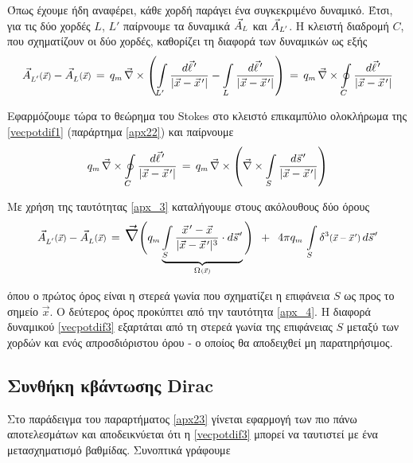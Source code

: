 Όπως έχουμε ήδη αναφέρει, κάθε χορδή παράγει ένα συγκεκριμένο δυναμικό. Έτσι, για τις δύο χορδές $L$, $L'$ παίρνουμε τα δυναμικά $\vec{A}\subscr{L}$ και $\vec{A}\subscr{L'}$. Η κλειστή διαδρομή $C$, που σχηματίζουν οι δύο χορδές, καθορίζει τη διαφορά των δυναμικών ως εξής
\begin{equation}\label{vecpotdif1}
    \vecfun[L']{A}{\vec{x}} - \vecfun[L]{A}{\vec{x}} \, = \, q\subscr{m}\,\vec{\nabla}\times \left(\int\limits_{L'} \frac{d\pvec{\ell}'}{|\vec{x}-\pvec{x}'|} - \int\limits_L \frac{d\pvec{\ell}'}{|\Vec{x}-\pvec{x}'|} \right) \, = \, q\subscr{m}\,\vec{\nabla}\times \oint\limits_C \frac{d\pvec{\ell}'}{|\Vec{x}-\pvec{x}'|}
\end{equation}

Εφαρμόζουμε τώρα το θεώρημα του Stokes στο κλειστό επικαμπύλιο ολοκλήρωμα της \eqref{vecpotdif1} (παράρτημα \ref{apx22}) και παίρνουμε 
\begin{equation}\label{vecpotdif2}
    q\subscr{m}\,\vec{\nabla}\times \oint\limits_C \frac{d\pvec{\ell}'}{|\Vec{x}-\pvec{x}'|}\, =\, q\subscr{m} \, \vec{\nabla}\times\left(\vec{\nabla}\times\int\limits_S \frac{d\pvec{s}'}{|\vec{x}-\pvec{x}'|}\right)
\end{equation}

Με χρήση της ταυτότητας \eqref{apx_3} καταλήγουμε στους ακόλουθους δύο όρους 
\begin{equation}\label{vecpotdif3}
    \vecfun[L']{A}{\vec{x}} - \vecfun[L]{A}{\vec{x}} \,=\, \text{\scalebox{1.5}{$\vec{\nabla}$}} \Bigg(q\subscr{m}\underbrace{\int\limits_S \frac{\pvec{x}'-\vec{x}}{|\vec{x}-\pvec{x}'|^3}\cdot d\pvec{s}'}_{\scafun{\Omega}{\vec{x}}}\Bigg) \,\,\,+\,\,\, 4\pi q\subscr{m} \,\int\limits_S \scafun[][3]{\delta}{\vec{x}-\pvec{x}'} \, d\pvec{s}'
\end{equation}

όπου ο πρώτος όρος είναι η στερεά γωνία που σχηματίζει η επιφάνεια $S$ ως προς το σημείο $\vec{x}$. Ο δεύτερος όρος προκύπτει από την ταυτότητα \eqref{apx_4}. Η διαφορά δυναμικού \eqref{vecpotdif3} εξαρτάται από τη στερεά γωνία της επιφάνειας $S$ μεταξύ των χορδών και ενός απροσδιόριστου όρου - ο οποίος θα αποδειχθεί μη παρατηρήσιμος. \\

\subsection{Συνθήκη κβάντωσης Dirac}

Στο παράδειγμα του παραρτήματος \ref{apx23} γίνεται εφαρμογή των πιο πάνω αποτελεσμάτων και αποδεικνύεται ότι η \eqref{vecpotdif3} μπορεί να ταυτιστεί με ένα μετασχηματισμό βαθμίδας. Συνοπτικά γράφουμε

